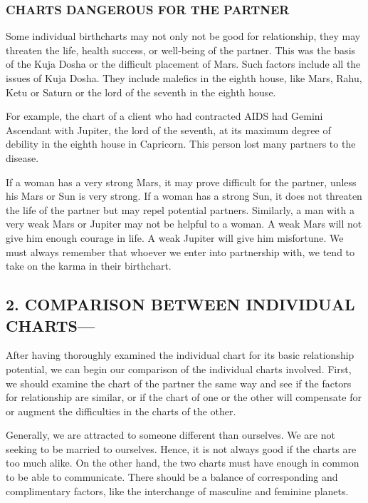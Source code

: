  

\subsubsection{CHARTS DANGEROUS FOR THE PARTNER}

 

Some individual birthcharts may not only not be good for relationship, they may threaten the life, health success, or well-being of the partner. This was the basis of the Kuja Dosha or the difficult placement of Mars. Such factors include all the issues of Kuja Dosha. They include malefics in the eighth house, like Mars, Rahu, Ketu or Saturn or the lord of the seventh in the eighth house.

 

For example, the chart of a client who had contracted AIDS had Gemini Ascendant with Jupiter, the lord of the seventh, at its maximum degree of debility in the eighth house in Capricorn. This person lost many partners to the disease.

 

If a woman has a very strong Mars, it may prove difficult for the partner, unless his Mars or Sun is very strong. If a woman has a strong Sun, it does not threaten the life of the partner but may repel potential partners. Similarly, a man with a very weak Mars or Jupiter may not be helpful to a woman. A weak Mars will not give him enough courage in life. A weak Jupiter will give him misfortune. We must always remember that whoever we enter into partnership with, we tend to take on the karma in their birthchart.

 

\subsection{2. COMPARISON BETWEEN INDIVIDUAL CHARTS—}
 

After having thoroughly examined the individual chart for its basic relationship potential, we can begin our comparison of the individual charts involved. First, we should examine the chart of the partner the same way and see if the factors for relationship are similar, or if the chart of one or the other will compensate for or augment the difficulties in the charts of the other.

 

Generally, we are attracted to someone different than ourselves. We are not seeking to be married to ourselves. Hence, it is not always good if the charts are too much alike. On the other hand, the two charts must have enough in common to be able to communicate. There should be a balance of corresponding and complimentary factors, like the interchange of masculine and feminine planets.

